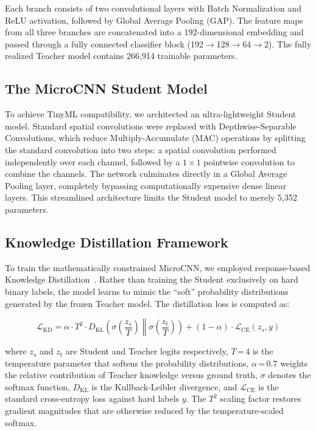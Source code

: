 \documentclass[conference]{IEEEtran}
\begin{document}
Each branch consists of two convolutional layers with Batch Normalization and ReLU activation, followed by Global Average Pooling (GAP). The feature maps from all three branches are concatenated into a 192-dimensional embedding and passed through a fully connected classifier block (192$\rightarrow$128$\rightarrow$64$\rightarrow$2). The fully realized Teacher model contains 266,914 trainable parameters.

\subsection{The MicroCNN Student Model}

To achieve TinyML compatibility, we architected an ultra-lightweight Student model. Standard spatial convolutions were replaced with Depthwise-Separable Convolutions, which reduce Multiply-Accumulate (MAC) operations by splitting the standard convolution into two steps: a spatial convolution performed independently over each channel, followed by a $1 \times 1$ pointwise convolution to combine the channels. The network culminates directly in a Global Average Pooling layer, completely bypassing computationally expensive dense linear layers. This streamlined architecture limits the Student model to merely 5,352 parameters.

\subsection{Knowledge Distillation Framework}

To train the mathematically constrained MicroCNN, we employed response-based Knowledge Distillation~\cite{hinton2015distilling}. Rather than training the Student exclusively on hard binary labels, the model learns to mimic the ``soft'' probability distributions generated by the frozen Teacher model. The distillation loss is computed as:

\begin{equation}
\mathcal{L}_{\text{KD}} = \alpha \cdot T^2 \cdot D_{\text{KL}}\!\left(\sigma\!\left(\frac{z_s}{T}\right) \middle\| \sigma\!\left(\frac{z_t}{T}\right)\right) + (1-\alpha) \cdot \mathcal{L}_{\text{CE}}(z_s, y)
\label{eq:kd}
\end{equation}

\noindent where $z_s$ and $z_t$ are Student and Teacher logits respectively, $T$\,=\,4 is the temperature parameter that softens the probability distributions, $\alpha$\,=\,0.7 weights the relative contribution of Teacher knowledge versus ground truth, $\sigma$ denotes the softmax function, $D_{\text{KL}}$ is the Kullback-Leibler divergence, and $\mathcal{L}_{\text{CE}}$ is the standard cross-entropy loss against hard labels $y$. The $T^2$ scaling factor restores gradient magnitudes that are otherwise reduced by the temperature-scaled softmax.
\end{document}
